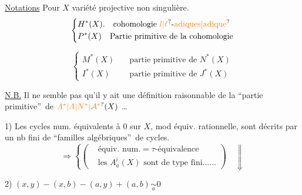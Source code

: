 \uline{Notations} \quad Pour $X$ variété projective non singulière.
\[
\left\{\begin{aligned}
&H^{*}(X).\quad \text{cohomologie $\unsure{l|\ell}$-\unsure{adiques|adique}}\\
&P^{*}(X)\quad \text{Partie primitive de la cohomologie}
\end{aligned}\right.
\]


\[
\left\{\begin{aligned}
M^{*}(X)&\quad\text{partie primitive de }N^{*}(X)\\
I^{*}(X)&\quad\text{partie primitive de }J^{*}(X)
\end{aligned}\right.
\]

\uline{N.B.} Il ne semble pas qu'il y ait une définition raisonnable de la \textquotedblleft partie primitive\textquotedblright\ de $\unsure{A^{*}|A|N^{*}|\mathcal A^{*}}(X)$ \ldots

1) Les cycles num. équivalents à $0$ sur $X$, mod équiv. rationnelle, sont décrits par un nb fini de \textquotedblleft familles algébriques\textquotedblright\ de cycles.
\[
\Longrightarrow\left\{\left(\begin{aligned}
&\text{équiv. num.}=\tau\text{-équivalence}\\
&\text{les } A^{i}_{a}(X)\text{ sont de type fini......}
\end{aligned}\right)\right.\quad\Downarrow
\]

2) \(\displaystyle (x,y)-(x,b)-(a,y)+(a,b)\underset{a}{\sim}0\)

